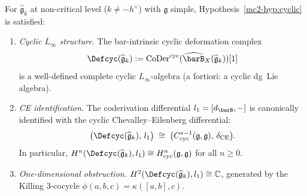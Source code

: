 \begin{theorem}\label{thm:mc2-1-km}
For $\widehat{\mathfrak{g}}_k$ at non-critical level ($k \neq -h^\vee$)
with $\mathfrak{g}$ simple, Hypothesis~\textup{\ref{mc2-hyp:cyclic}}
is satisfied:
\begin{enumerate}[label=\textup{(\roman*)}]
\item \emph{Cyclic $L_\infty$ structure.}
  The bar-intrinsic cyclic deformation complex
  \[
  \Defcyc(\widehat{\mathfrak{g}}_k)
  := \operatorname{CoDer}^{\mathrm{cyc}}(\widehat{\barB}_X
  (\widehat{\mathfrak{g}}_k))[1]
  \]
  is a well-defined complete cyclic $L_\infty$-algebra
  \textup{(}a fortiori: a cyclic dg~Lie algebra\textup{)}.

\item \emph{CE identification.}
  The coderivation differential $l_1 = [d_{\barB},-]$ is canonically
  identified with the cyclic Chevalley--Eilenberg differential:
  \begin{equation}\label{eq:coder-ce-ident}
  \bigl(\Defcyc(\widehat{\mathfrak{g}}_k),\, l_1\bigr)
  \;\cong\;
  \bigl(C^{*-1}_{\mathrm{cyc}}(\mathfrak{g},\mathfrak{g}),\,
  \delta_{\mathrm{CE}}\bigr).
  \end{equation}
  In particular,
  $H^n(\Defcyc(\widehat{\mathfrak{g}}_k), l_1) \cong
  H^n_{\mathrm{cyc}}(\mathfrak{g},\mathfrak{g})$
  for all $n \geq 0$.

\item \emph{One-dimensional obstruction.}
  $H^2(\Defcyc(\widehat{\mathfrak{g}}_k), l_1) \cong \mathbb{C}$,
  generated by the Killing $3$-cocycle
  $\phi(a,b,c) = \kappa([a,b],c)$.
\end{enumerate}
\end{theorem}

